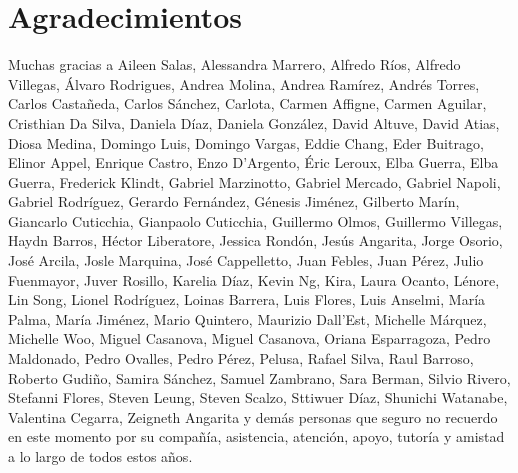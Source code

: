 \chapter*{Agradecimientos}

Muchas gracias a Aileen Salas, Alessandra Marrero, Alfredo Ríos, Alfredo Villegas, Álvaro Rodrigues, Andrea Molina, Andrea Ramírez, Andrés Torres, Carlos Castañeda, Carlos Sánchez, Carlota, Carmen Affigne, Carmen Aguilar, Cristhian Da Silva, Daniela Díaz, Daniela González, David Altuve, David Atias, Diosa Medina, Domingo Luis, Domingo Vargas, Eddie Chang, Eder Buitrago, Elinor Appel, Enrique Castro, Enzo D'Argento, Éric Leroux, Elba Guerra, Elba Guerra, Frederick Klindt, Gabriel Marzinotto, Gabriel Mercado, Gabriel Napoli, Gabriel Rodríguez, Gerardo Fernández, Génesis Jiménez, Gilberto Marín, Giancarlo Cuticchia, Gianpaolo Cuticchia, Guillermo Olmos, Guillermo Villegas, Haydn Barros, Héctor Liberatore, Jessica Rondón, Jesús Angarita, Jorge Osorio, José Arcila, Josle Marquina, José Cappelletto, Juan Febles, Juan Pérez, Julio Fuenmayor, Juver Rosillo, Karelia Díaz, Kevin Ng, Kira, Laura Ocanto, Lénore, Lin Song, Lionel Rodríguez, Loinas Barrera, Luis Flores, Luis Anselmi, María Palma, María Jiménez, Mario Quintero, Maurizio Dall'Est, Michelle Márquez, Michelle Woo, Miguel Casanova, Miguel Casanova, Oriana Esparragoza, Pedro Maldonado, Pedro Ovalles, Pedro Pérez, Pelusa, Rafael Silva, Raul Barroso, Roberto Gudiño, Samira Sánchez, Samuel Zambrano, Sara Berman, Silvio Rivero, Stefanni Flores, Steven Leung, Steven Scalzo, Sttiwuer Díaz, Shunichi Watanabe, Valentina Cegarra, Zeigneth Angarita y demás personas que seguro no recuerdo en este momento por su compañía, asistencia, atención, apoyo, tutoría y amistad a lo largo de todos estos años.
